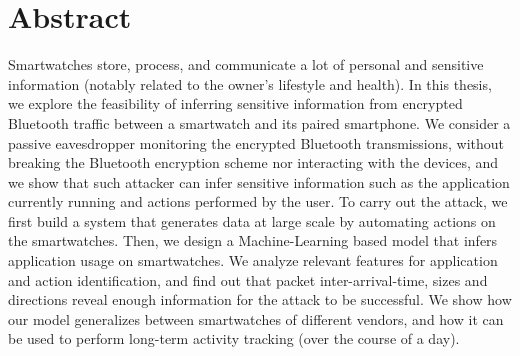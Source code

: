 \chapter{Abstract}
Smartwatches store, process, and communicate a lot of personal and sensitive information (notably related to the owner's lifestyle and health). In this thesis, we explore the feasibility of inferring sensitive information from encrypted Bluetooth traffic between a smartwatch and its paired smartphone. We consider a passive eavesdropper monitoring the encrypted Bluetooth transmissions, without breaking the Bluetooth encryption scheme nor interacting with the devices, and we show that such attacker can infer sensitive information such as the application currently running and actions performed by the user. To carry out the attack, we first build a system that generates data at large scale by automating actions on the smartwatches. Then, we design a Machine-Learning based model that infers application usage on smartwatches. We analyze relevant features for application and action identification, and find out that packet inter-arrival-time, sizes and directions reveal enough information for the attack to be successful. We show how our model generalizes between smartwatches of different vendors, and how it can be used to perform long-term activity tracking (over the course of a day).
